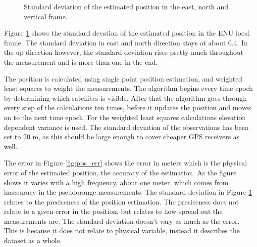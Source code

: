 \documentclass{article}
\begin{document}
\begin{figure}[!ht]
    \centering
    \caption{Standard deviation of the estimated position in the east, north and vertical frame.}
    \label{fig:pos_std}
\end{figure}

Figure \ref{fig:pos_std} shows the standard devation of the estimated position in the ENU local frame. The standard deviation in east and north direction stays at about $0.4$. In the up direction however, the standard deviation rises pretty much throughout the measurement and is more than one in the end.

The position is calculated using single point position estimation, and weighted least squares to weight the measurements. The algorithm begins every time epoch by determining which satellites is visible. After that the algorithm goes through every step of the calculations ten times, before it updates the position and moves on to the next time epoch. For the weighted least squares calculations elevation dependent variance is used. The standard deviation of the observations has been set to $20$ m, as this should be large enough to cover cheaper GPS receivers as well.

The error in Figure \ref{fig:pos_err} shows the error in meters which is the physical error of the estimated position, the accuracy of the estimation. As the figure shows it varies with a high frequency, about one meter, which comes from inaccuracy in the pseudorange measurements. The standard deviation in Figure \ref{fig:pos_std} relates to the preciseness of the position estimation. The preciseness does not relate to a given error in the position, but relates to how spread out the measurements are. The standard deviation doesn't vary as much as the error. This is because it does not relate to physical variable, instead it describes the dataset as a whole.
\end{document}
